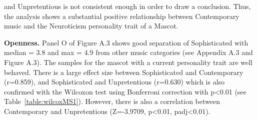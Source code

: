 and Unpretentious is not consistent enough in order to draw a conclusion. Thus, the analysis shows a substantial positive
relationship between Contemporary music and the Neuroticism personality trait of a Mascot.
\par \textbf{Openness.} Panel O of Figure A.3 shows good separation of Sophisticated with median = 3.8 and max = 4.9
from other music categories (see Appendix A.3 and Figure A.3). The samples for the mascot with a current personality
trait are well behaved. There is a large effect size between Sophisticated and Contemporary (r=0.859), and Sophisticated
and Unpretentious (r=0.630) which is also confirmed with the Wilcoxon test using Bonferroni correction with p<0.01
(see Table~\ref{table:wilcoxMS1}). However, there is also a correlation between Contemporary and Unpretentious
(Z=-3.9709, p<0.01, padj<0.01).

